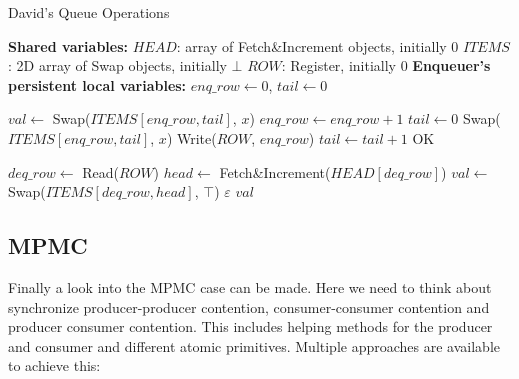 \begin{algorithm}[!ht]
    \centering
    \captionsetup{justification=centering}
    \caption{David's Queue Operations \cite{Mateíspmc}}
    \label{alg:david-queue}
    \scriptsize
    \begin{algorithmic}[1]
        \State \textbf{Shared variables:}
        \State $HEAD$: array of Fetch\&Increment objects, initially 0
        \State $ITEMS$: 2D array of Swap objects, initially $\bot$
        \State $ROW$: Register, initially 0
        \State
        \State \textbf{Enqueuer's persistent local variables:}
        \State $enq\_row \gets 0$, $tail \gets 0$
        
        \State
        
         
            \State $val \gets$ Swap($ITEMS[enq\_row, tail]$, $x$) 
             
                \State $enq\_row \gets enq\_row + 1$ 
                \State $tail \gets 0$
                \State Swap($ITEMS[enq\_row, tail]$, $x$) 
                \State Write($ROW$, $enq\_row$) 
            \EndIf
            \State $tail \gets tail + 1$
            \State \Return OK
        \EndProcedure
        
        \State
        
         
            \State $deq\_row \gets$ Read($ROW$) 
            \State $head \gets$ Fetch\&Increment($HEAD[deq\_row]$) 
            \State $val \gets$ Swap($ITEMS[deq\_row, head]$, $\top$) 
             
                \State \Return $\varepsilon$ 
            \Else
                \State \Return $val$ 
            \EndIf
        \EndFunction
    \end{algorithmic}
\end{algorithm}

\subsection{\acf{MPMC}}\label{subsec:multiple-producer-and-multiple-consumer}
Finally a look into the \ac{MPMC} case can be made. Here we need to think about synchronize producer-producer contention, consumer-consumer contention and producer consumer contention. This includes helping methods for the producer and consumer and different atomic primitives. Multiple approaches are available to achieve this:


